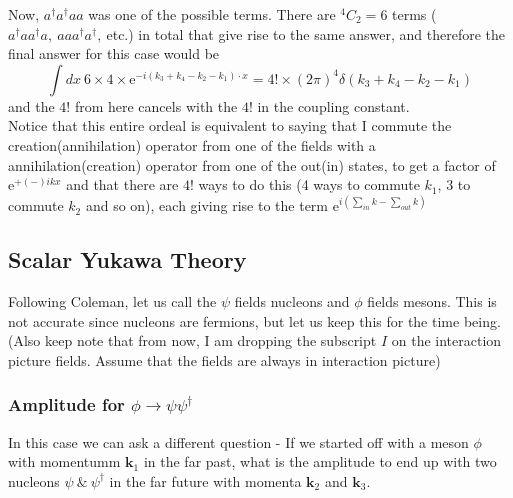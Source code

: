 \documentclass[11pt, notitlepage]{report}
\newcommand{\e}{\mathrm{e}}
\numberwithin{equation}{section}
\begin{document}
{        Now, \(a^\dagger a^\dagger a a\) was one of the possible terms. There are \({}^4C_2 = 6\) terms (\(a^\dagger a a^\dagger a,~aaa^\dagger a^\dagger,~\)etc.) in total that give rise to the same answer, and therefore the final answer for this case would be 
        \begin{equation*}
            \int dx ~6\times 4\times \e^{-i(k_3 + k_4 - k_2 - k_1)\cdot x} = 4! \times (2\pi)^4 \delta(k_3 + k_4 - k_2 - k_1)
        \end{equation*}
        and the \(4!\) from here cancels with the \(4!\) in the coupling constant. \\
        Notice that this entire ordeal is equivalent to saying that I commute the creation(annihilation) operator from one of the fields with a annihilation(creation) operator from one of the out(in) states, to get a factor of \(\e^{+(-)ikx}\) and that there are \(4!\) ways to do this (4 ways to commute \(k_1\), 3 to commute \(k_2\) and so on), each giving rise to the term \(\e^{i(\sum_{in}k - \sum_{out}k)}\)
    }

    \subsection{Scalar Yukawa Theory}
    Following Coleman, let us call the \(\psi\) fields nucleons and \(\phi\) fields mesons. This is not accurate since nucleons are fermions, but let us keep this for the time being. (Also keep note that from now, I am dropping the subscript \(I\) on the interaction picture fields. Assume that the fields are always in interaction picture)
    
    \subsubsection{Amplitude for \(\phi\to\psi\psi^\dagger\)}
    In this case we can ask a different question - If we started off with a meson \(\phi\) with momentumm \(\textbf{k}_1\) in the far past, what is the amplitude to end up with two nucleons \(\psi~\&~\psi^\dagger\) in the far future with momenta \(\textbf{k}_2\) and \(\textbf{k}_3\). \\
\end{document}
